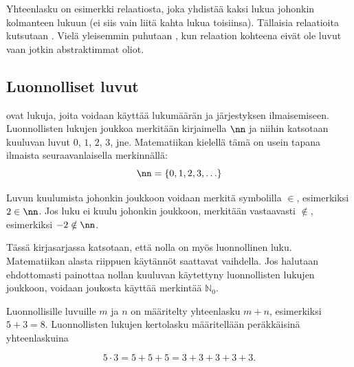 \begin{esimerkki}
\end{esimerkki}

Yhteenlasku on esimerkki relaatiosta, joka yhdistää kaksi lukua johonkin kolmanteen lukuun (ei siis vain liitä kahta lukua toisiinsa). Tällaisia relaatioita kutsutaan . Vielä yleisemmin puhutaan , kun relaation kohteena eivät ole luvut vaan jotkin abstraktimmat oliot.

\subsection*{Luonnolliset luvut}

 ovat lukuja, joita voidaan käyttää lukumäärän ja järjestyksen ilmaisemiseen. Luonnollisten lukujen joukkoa merkitään kirjaimella $\nn$ ja niihin katsotaan kuuluvan luvut $0$, $1$, $2$, $3$, jne. Matematiikan kielellä tämä on usein tapana ilmaista seuraavanlaisella merkinnällä: \[\nn = \{0, 1, 2, 3, \ldots\}\]

Luvun kuulumista johonkin joukkoon voidaan merkitä symbolilla $\in$, esimerkiksi $2 \in \nn$. Jos luku ei kuulu johonkin joukkoon, merkitään vastaavasti $\notin$, esimerkiksi
$-2 \notin \nn$.

Tässä kirjasarjassa katsotaan, että nolla on myös luonnollinen luku. Matematiikan alasta riippuen käytännöt saattavat vaihdella. Jos halutaan ehdottomasti painottaa nollan kuuluvan käytettyny luonnollisten lukujen joukkoon, voidaan joukosta käyttää merkintää $\mathbb{N}_0$.

Luonnollisille luvuille $m$ ja $n$ on määritelty yhteenlasku $m + n$, esimerkiksi $5 + 3 = 8$. Luonnollisten lukujen kertolasku määritellään peräkkäisinä yhteenlaskuina

\[5 \cdot 3 = 5 + 5 + 5 = 3 + 3 + 3 + 3 + 3.\]

